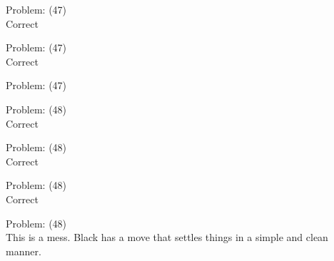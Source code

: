 \documentclass[11pt]{article}
\begin{document}
\begin{minipage}[t]{0.5\textwidth}
  {\centering
  
Problem: (47)\\
Correct\\
  }
\end{minipage}
\begin{minipage}[t]{0.5\textwidth}
  {\centering
  
Problem: (47)\\
Correct\\
  }
\end{minipage}
\begin{minipage}[t]{0.5\textwidth}
  {\centering
  
Problem: (47)\\
  }
\end{minipage}
\begin{minipage}[t]{0.5\textwidth}
  {\centering
  
Problem: (48)\\
Correct\\
  }
\end{minipage}
\begin{minipage}[t]{0.5\textwidth}
  {\centering
  
Problem: (48)\\
Correct\\
  }
\end{minipage}
\begin{minipage}[t]{0.5\textwidth}
  {\centering
  
Problem: (48)\\
Correct\\
  }
\end{minipage}
\begin{minipage}[t]{0.5\textwidth}
  {\centering
  
Problem: (48)\\
This is a mess. Black has a move that settles things in a simple and clean manner.\\
  }
\end{minipage}
\end{document}
